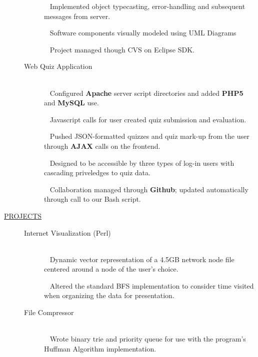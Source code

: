 \documentclass{article}
\begin{document}
\begin{description}
\begin{description}
            \textbullet ~ Implemented object typecasting, error-handling and subsequent messages from server.  


            \textbullet ~ Software components visually modeled using UML Diagrams

            \textbullet ~ Project managed though CVS on Eclipse SDK.

        \iffalse
		\item[Web QuizMaker Front-End] \hfill \\
            \textbullet ~ Vanilla Javascript quiz-taking 

            \textbullet ~ 

            \textbullet ~
        \fi
		\item[Web Quiz Application] \hfill \\
            \textbullet ~ Configured {\bf Apache} server script directories and added {\bf PHP5 } and {\bf MySQL} use.

            \textbullet ~ Javascript calls for user created quiz submission and evaluation.

            \textbullet ~ Pushed JSON-formatted quizzes and quiz mark-up from the user through {\bf AJAX} calls on the frontend.

            \textbullet ~ Designed to be accessible by three types of log-in users with cascading priveledges to quiz data. 

            \textbullet ~ Collaboration managed through {\bf Github}; updated automatically through call to our Bash script.

        \end{description}

        \vspace{-.1in}

    \item[\underline{PROJECTS}] \hfill
        \vspace{-.1in}
        \begin{description}
        \item[Internet Visualization (Perl)] \hfill \\
		    \textbullet ~ Dynamic vector representation of a 4.5GB network node file centered around a
            node of the user's choice.
                
            \textbullet ~ Altered the standard BFS implementation to consider time visited when 
            organizing the data for presentation.

		\item[File Compressor] \hfill \\
            \textbullet ~ Wrote binary trie and priority queue for use with the program's Huffman Algorithm implementation.
                

\end{description}
\end{description}
\end{document}

